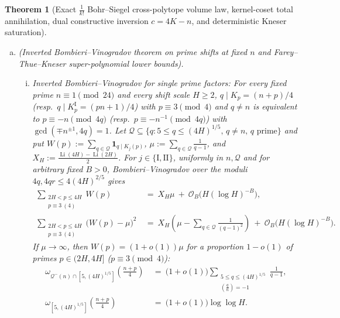 \documentclass[11pt, a4paper]{article}
\theoremstyle{plain}
\newtheorem{theorem}{Theorem}[section]
\theoremstyle{definition}
\newcommand{\leg}[2]{\left(\frac{#1}{#2}\right)}
\begin{document}
\begin{theorem}[Exact $\frac{1}{k!}$ Bohr--Siegel cross-polytope volume law, kernel-coset total annihilation, dual constructive inversion $c=4K-n$, and deterministic Kneser saturation]
\begin{enumerate}[(a)]
    \item \emph{(Inverted Bombieri--Vinogradov theorem on prime shifts at fixed $n$ and Farey--Thue--Kneser super-polynomial lower bounds).}
    \begin{enumerate}[(i)]
        \item \emph{Inverted Bombieri--Vinogradov for single prime factors:} For every fixed prime $n\equiv1\pmod{24}$ and every shift scale $H\ge2$, $q\mid K_p=(n+p)/4$ (resp.\ $q\mid K_p^{\mathrm{I}}=(pn+1)/4$) with $p\equiv3\pmod 4$ and $q\neq n$ is equivalent to $p\equiv-n\pmod{4q}$ (resp.\ $p\equiv-n^{-1}\pmod{4q}$) with $\gcd(\mp n^{\pm1},4q)=1$. Let $\mathcal{Q}\subseteq\{q:5\le q\le(4H)^{1/5},\,q\ne n,\,q\text{ prime}\}$ and put $W(p):=\sum_{q\in\mathcal{Q}}\mathbf{1}_{q\mid K_j(p)}$, $\mu:=\sum_{q\in\mathcal{Q}}\frac{1}{q-1}$, and $X_H:=\frac{\operatorname{Li}(4H)-\operatorname{Li}(2H)}{2}$. For $j\in\{\mathrm{I},\mathrm{II}\}$, uniformly in $n,\mathcal{Q}$ and for arbitrary fixed $B>0$, Bombieri--Vinogradov over the moduli $4q,4qr\le 4(4H)^{2/5}$ gives
        \[
        \begin{aligned}
        \sum_{\substack{2H<p\le 4H\\ p\equiv 3\ (4)}}W(p)\ &=\ X_H\mu\ +\ \mathcal{O}_B\big(H(\log H)^{-B}\big),\\
        \sum_{\substack{2H<p\le 4H\\ p\equiv 3\ (4)}}\big(W(p)-\mu\big)^{2}\ &=\ X_H\!\left(\mu-\sum_{q\in\mathcal{Q}}\frac{1}{(q-1)^{2}}\right)\ +\ \mathcal{O}_B\big(H(\log H)^{-B}\big).
        \end{aligned}
        \]
        If $\mu\to\infty$, then $W(p)=(1+o(1))\mu$ for a proportion $1-o(1)$ of primes $p\in(2H,4H]$ ($p\equiv 3\pmod 4$):
        \begin{equation}\label{eq:inverted_BV_prime_shifts}
        \begin{split}
        \omega_{\mathcal{Q}^{-}(n)\cap[5,(4H)^{1/5}]}\!\left(\frac{n+p}{4}\right)\ &=\ \big(1+o(1)\big)\sum_{\substack{5\le q\le(4H)^{1/5}\\ \leg{q}{n}=-1}}\frac{1}{q-1},\\
        \omega_{[5,(4H)^{1/5}]}\!\left(\frac{n+p}{4}\right)\ &=\ \big(1+o(1)\big)\log\log H.
        \end{split}
        \end{equation}


\end{enumerate}
\end{enumerate}
\end{theorem}
\end{document}
